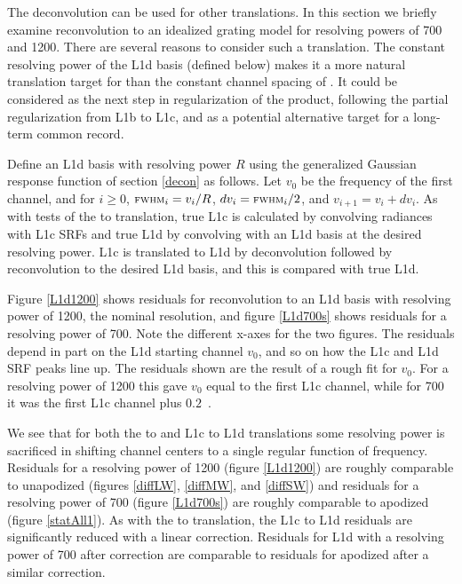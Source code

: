 \documentclass[journal]{IEEEtran}
\begin{document}

The {\airs} deconvolution can be used for other translations.  
In this section we briefly examine reconvolution to an idealized
grating model for resolving powers of 700 and 1200.  There are
several reasons to consider such a translation.  The constant
resolving power of the L1d basis (defined below) makes it a more
natural translation target for {\airs} than the constant channel
spacing of {\cris}.  It could be considered as the next step in
regularization of the {\airs} product, following the partial
regularization from L1b to L1c, and as a potential alternative
target for a long-term common record.

Define an {\airs} L1d basis with resolving power $R$ using the
generalized Gaussian response function of section \ref{decon} as
follows.  Let $v_0$ be the frequency of the first channel, and for
$i\ge0$, $\mbox{\small\textsc{fwhm}}_i = v_i / R$, $dv_i = \mbox{\small\textsc{fwhm}}_i / 2$, and $v_{i+1} =
v_i + dv_i$.  As with tests of the {\airs} to {\cris} translation,
true L1c is calculated by convolving {\kcarta} radiances with
{\airs} L1c SRFs and true L1d by convolving with an L1d basis at the
desired resolving power.  L1c is translated to L1d by deconvolution
followed by reconvolution to the desired L1d basis, and this is
compared with true L1d.

Figure \ref{L1d1200} shows residuals for reconvolution to an L1d
basis with resolving power of 1200, the nominal {\airs} resolution,
and figure \ref{L1d700s} shows residuals for a resolving power of
700.  Note the different x-axes for the two figures.  The residuals
depend in part on the L1d starting channel $v_0$, and so on how the
L1c and L1d SRF peaks line up.  The residuals shown are the result
of a rough fit for $v_0$.  For a resolving power of 1200 this gave
$v_0$ equal to the first L1c channel, while for 700 it was the first
L1c channel plus $0.2$~\wn.

We see that for both the {\airs} to {\cris} and L1c to L1d
translations some resolving power is sacrificed in shifting channel
centers to a single regular function of frequency.  Residuals for a
resolving power of 1200 (figure \ref{L1d1200}) are roughly
comparable to unapodized {\cris} (figures \ref{diffLW},
\ref{diffMW}, and \ref{diffSW}) and residuals for a resolving power
of 700 (figure \ref{L1d700s}) are roughly comparable to apodized
{\cris} (figure \ref{statAll1}).  As with the {\airs} to {\cris}
translation, the L1c to L1d residuals are significantly reduced with
a linear correction.  Residuals for L1d with a resolving power of
700 after correction are comparable to residuals for apodized
{\cris} after a similar correction.
\end{document}
